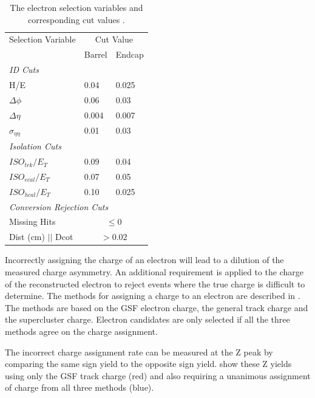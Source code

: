 \begin{table}[htbp]
  \begin{center}
    \leavevmode
    \begin{tabular}{lll} 
    \toprule
     Selection Variable & \multicolumn{2}{c}{Cut Value}\\
                        & Barrel & Endcap\\
\midrule 
  \multicolumn{3}{l}{\emph{ID Cuts}}\\
   H/E & 0.04 & 0.025 \\
  $\Delta\phi$ & 0.06 & 0.03 \\
  $\Delta\eta$ & 0.004 & 0.007  \\
  $\sigma_{\eta\eta}$ & 0.01 & 0.03 \\
  \midrule \multicolumn{3}{l}{\emph{Isolation Cuts}}\\
  $ISO_{trk} / E_T $  & 0.09 & 0.04 \\ 
  $ISO_{ecal}/ E_T$  & 0.07 & 0.05 \\
  $ISO_{hcal}/ E_T$  & 0.10 & 0.025 \\ 
  \midrule
   \multicolumn{3}{l}{\emph{Conversion Rejection Cuts}}\\
    Missing Hits  & \multicolumn{2}{c}{$\leq 0$}\\
    Dist (cm) $||$ Dcot   & \multicolumn{2}{c}{$>0.02$}\\
  \bottomrule 
  \end{tabular} 
  \caption{\label{tab:electronselection}The electron
  selection variables and corresponding cut values
  \cite{simplecutbasedeleid}.} 
  \end{center} 
\end{table}

Incorrectly assigning the charge of an electron will lead to a dilution of the
measured charge asymmetry.  An additional requirement is applied to the charge
of the reconstructed electron to reject events where the true charge is
difficult to determine.  The methods for assigning a charge to an electron are
described in . The methods are based on the GSF electron
charge, the general track charge and the supercluster charge.
Electron candidates are only selected if all the three methods agree on the
charge assignment.

The incorrect charge assignment rate can be measured at the Z peak by comparing
the same sign \HepProcess{\PZ\to\Pepm\Pepm} yield to the opposite sign
\HepProcess{\PZ\to\Pelectron\APelectron} yield.  show these
Z yields using only the {GSF} track charge (red) and also requiring a unanimous
assignment of charge from all three methods (blue). 

